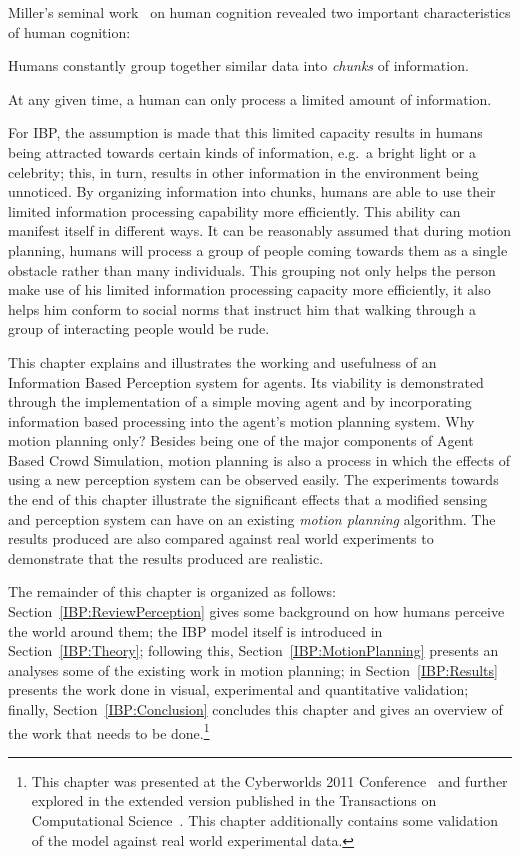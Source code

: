 Miller's seminal work~\cite{Miller:1956tr} on human cognition revealed two important characteristics of human cognition:
\begin{inparaenum}
\item Humans constantly group together similar data into \emph{chunks} of information.
\item At any given time, a human can only process a limited amount of information.
\end{inparaenum}
For IBP, the assumption is made that this limited capacity results in humans being attracted towards certain kinds of information, e.g.\ a bright light or a celebrity; this, in turn, results in other information in the environment being unnoticed. By organizing information into chunks, humans are able to use their limited information processing capability more efficiently. This ability can manifest itself in different ways. It can be reasonably assumed that during motion planning, humans will process a group of people coming towards them as a single obstacle rather than many individuals. This grouping not only helps the person make use of his limited information processing capacity more efficiently,  it also helps him conform to social norms that instruct him that walking through a group of interacting people would be rude.


This chapter explains and illustrates the working and usefulness of an Information Based Perception system for agents. Its viability is demonstrated through the implementation of a simple moving agent and by incorporating information based processing into the agent's motion planning system. Why motion planning only? Besides being one of the major components of Agent Based Crowd Simulation, motion planning is also a process in which the effects of using a new perception system can be observed easily. The experiments towards the end of this chapter illustrate the significant effects that a modified sensing and perception system can have on an existing \emph{motion planning} algorithm. The results produced are also compared against real world experiments to demonstrate that the results produced are realistic.

The remainder of this chapter is organized as follows: Section~\ref{IBP:ReviewPerception} gives some background on how humans perceive the world around them; the IBP model itself is introduced in Section~\ref{IBP:Theory}; following this, Section~\ref{IBP:MotionPlanning} presents an analyses some of the existing work in motion planning; in Section~\ref{IBP:Results} presents the work done in visual, experimental and quantitative validation; finally, Section~\ref{IBP:Conclusion} concludes this chapter and gives an overview of the work that needs to be done.\footnote{This chapter was presented at the Cyberworlds 2011 Conference~\cite{Viswanathan:2011uy} and further explored in the extended version published in the Transactions on Computational Science~\cite{Viswanathan:ut}. This chapter additionally contains some validation of the model against real world experimental data.}

